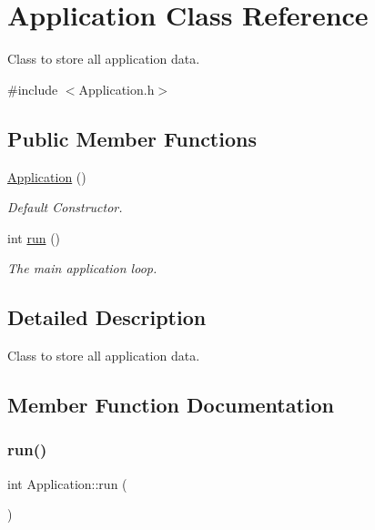\hypertarget{class_application}{}\section{Application Class Reference}
\label{class_application}


Class to store all application data.  




{\ttfamily \#include $<$Application.\+h$>$}

\subsection*{Public Member Functions}
\begin{DoxyCompactItemize}
\item 
\mbox{\label{class_application_afa8cc05ce6b6092be5ecdfdae44e05f8}} 
\mbox{\hyperlink{class_application_afa8cc05ce6b6092be5ecdfdae44e05f8}{Application}} ()
\begin{DoxyCompactList}\small\item\em Default Constructor. \end{DoxyCompactList}\item 
int \mbox{\hyperlink{class_application_a8cf8941c8db90117d3735bce5ae1fdf4}{run}} ()
\begin{DoxyCompactList}\small\item\em The main application loop. \end{DoxyCompactList}\end{DoxyCompactItemize}


\subsection{Detailed Description}
Class to store all application data. 

\subsection{Member Function Documentation}
\mbox{\label{class_application_a8cf8941c8db90117d3735bce5ae1fdf4}} 
\subsubsection{\texorpdfstring{run()}{run()}}
{\footnotesize\ttfamily int Application\+::run (\begin{DoxyParamCaption}{ }\end{DoxyParamCaption})}




